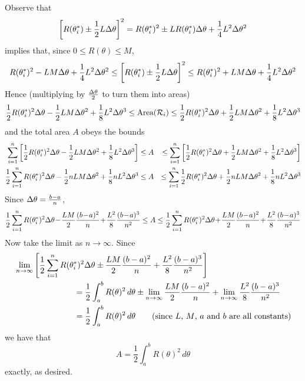 Observe that
\begin{equation*}
\left[R(\theta_i^*)\pm \frac{1}{2} L\Delta\theta\right]^2
=R(\theta_i^*)^2 \pm L R(\theta_i^*)\Delta\theta +\frac{1}{4} L^2\Delta\theta^2
\end{equation*}
implies that, since $0\le R(\theta)\le M$,
\begin{equation*}
R(\theta_i^*)^2 - L M\Delta\theta +\frac{1}{4} L^2\Delta\theta^2
\le \left[R(\theta_i^*)\pm \frac{1}{2} L\Delta\theta\right]^2
\le R(\theta_i^*)^2 + L M\Delta\theta +\frac{1}{4} L^2\Delta\theta^2
\end{equation*}
Hence (multiplying by $\frac{\Delta\theta}{2}$ to turn them into areas)
\begin{equation*}
\frac{1}{2} R(\theta_i^*)^2\Delta\theta - \frac{1}{2} L M\Delta\theta^2 
           +\frac{1}{8} L^2\Delta\theta^3
\le\text{Area}(\mathcal{R}_i)
\le \frac{1}{2} R(\theta_i^*)^2\Delta\theta 
        + \frac{1}{2} L M\Delta\theta^2 +\frac{1}{8} L^2\Delta\theta^3
\end{equation*}
and the total area $A$ obeys the bounds
\begin{alignat*}{3}
\sum_{i=1}^n\left[ \frac{1}{2} R(\theta_i^*)^2\Delta\theta 
    - \frac{1}{2} L M\Delta\theta^2 +\frac{1}{8} L^2\Delta\theta^3\right]
&\le A
&\le \sum_{i=1}^n\left[\frac{1}{2} R(\theta_i^*)^2\Delta\theta 
       + \frac{1}{2} L M\Delta\theta^2 +\frac{1}{8} L^2\Delta\theta^3\right] \\
\frac{1}{2}\sum_{i=1}^n R(\theta_i^*)^2\Delta\theta 
  - \frac{1}{2}  n L M\Delta\theta^2 +\frac{1}{8} n L^2\Delta\theta^3
&\le A
&\le \sum_{i=1}^n\frac{1}{2} R(\theta_i^*)^2\Delta\theta + \frac{1}{2} n L M\Delta\theta^2 +\frac{1}{8} 
nL^2\Delta\theta^3
\end{alignat*}
Since $\Delta \theta=\frac{b-a}{n}$,
\begin{align*}
\frac{1}{2}\sum_{i=1}^n R(\theta_i^*)^2\De\theta 
\!-\! \frac{ L M}{2}\frac{(b\!-\!a)^2}{n} 
\!+\!\frac{L^2}{8} \frac{(b\!-\!a)^3}{n^2}
\le A
\le \frac{1}{2}\sum_{i=1}^n R(\theta_i^*)^2\De\theta 
   \!+\! \frac{ L M}{2}\frac{(b\!-\!a)^2}{n} 
   \!+\! \frac{L^2}{8} \frac{(b\!-\!a)^3}{n^2}
\end{align*}
Now take the limit as $n\rightarrow\infty$. Since
\begin{align*}
&\lim_{n\rightarrow\infty}\left[
   \frac{1}{2}\sum_{i=1}^n R(\theta_i^*)^2\Delta\theta 
   \pm \frac{ L M}{2}\frac{(b-a)^2}{n} 
   +\frac{L^2}{8} \frac{(b-a)^3}{n^2}\right]
\cr
&\hskip1in=\frac{1}{2}\int_a^b R(\theta)^2\,d\theta
\pm \lim_{n\rightarrow\infty}\frac{ L M}{2}\frac{(b-a)^2}{n}
+\lim_{n\rightarrow\infty}\frac{L^2}{8} \frac{(b-a)^3}{n^2}\\
&\hskip1in=\frac{1}{2}\int_a^b R(\theta)^2\,d\theta \qquad
\text{(since $L$, $M$, $a$ and $b$ are all constants)} 
\end{align*}
we have that
\begin{equation*}
A=\frac{1}{2}\int_a^b R(\theta)^2\,d\theta
\end{equation*}
exactly, as desired.


